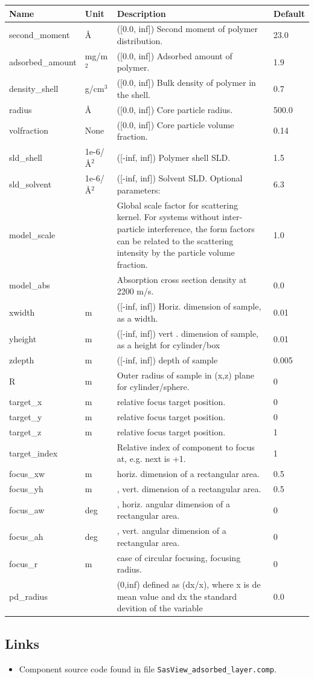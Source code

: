 \begin{longtable}{p{}p{}p{}p{}}
\toprule
\textbf{Name} & \textbf{Unit} & \textbf{Description} & \textbf{Default} \\
\midrule
\endhead
second\_moment & \AA{} & ([0.0, inf]) Second moment of polymer distribution. & 23.0 \\
adsorbed\_amount & mg/m$^{2}$ & ([0.0, inf]) Adsorbed amount of polymer. & 1.9 \\
density\_shell & g/cm$^{3}$ & ([0.0, inf]) Bulk density of polymer in the shell. & 0.7 \\
radius & \AA{} & ([0.0, inf]) Core particle radius. & 500.0 \\
volfraction & None & ([0.0, inf]) Core particle volume fraction. & 0.14 \\
sld\_shell & 1e-6/\AA{}$^{2}$ & ([-inf, inf]) Polymer shell SLD. & 1.5 \\
sld\_solvent & 1e-6/\AA{}$^{2}$ & ([-inf, inf]) Solvent SLD. Optional parameters: & 6.3 \\
model\_scale &   & Global scale factor for scattering kernel. For systems without inter-particle interference, the form factors can be related to the scattering intensity by the particle volume fraction. & 1.0 \\
model\_abs &   & Absorption cross section density at 2200 m/s. & 0.0 \\
xwidth & m & ([-inf, inf]) Horiz. dimension of sample, as a width. & 0.01 \\
yheight & m & ([-inf, inf]) vert . dimension of sample, as a height for cylinder/box & 0.01 \\
zdepth & m & ([-inf, inf]) depth of sample & 0.005 \\
R & m & Outer radius of sample in (x,z) plane for cylinder/sphere. & 0 \\
target\_x & m & relative focus target position. & 0 \\
target\_y & m & relative focus target position. & 0 \\
target\_z & m & relative focus target position. & 1 \\
target\_index &   & Relative index of component to focus at, e.g. next is +1. & 1 \\
focus\_xw & m & horiz. dimension of a rectangular area. & 0.5 \\
focus\_yh & m & , vert. dimension of a rectangular area. & 0.5 \\
focus\_aw & deg & , horiz. angular dimension of a rectangular area. & 0 \\
focus\_ah & deg & , vert. angular dimension of a rectangular area. & 0 \\
focus\_r & m & case of circular focusing, focusing radius. & 0 \\
pd\_radius &  & (0,inf) defined as (dx/x), where x is de mean value and dx the standard devition of the variable & 0.0 \\
\bottomrule
\end{longtable}

\subsection*{Links}
\begin{itemize}
  \item Component source code found in file \texttt{SasView\_adsorbed\_layer.comp}.
\end{itemize}
